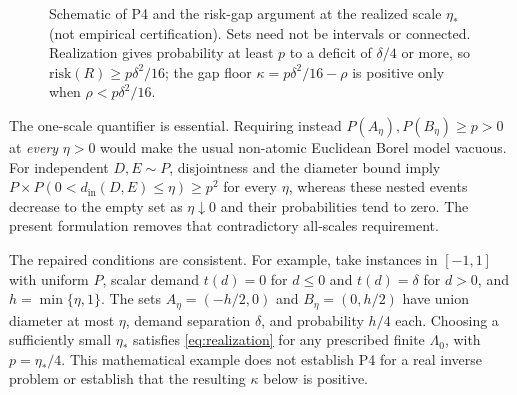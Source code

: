 \documentclass[twoside,11pt]{article}
\begin{document}
\begin{figure}[t]
\caption{Schematic of P4 and the risk-gap argument at the realized scale $\eta_*$ (not empirical certification). Sets need not be intervals or connected. Realization gives probability at least $p$ to a deficit of $\delta/4$ or more, so $\mathrm{risk}(R)\geq p\delta^2/16$; the gap floor $\kappa=p\delta^2/16-\rho$ is positive only when $\rho<p\delta^2/16$.}
\label{fig:p4-geometry}
\end{figure}

The one-scale quantifier is essential. Requiring instead $P(A_\eta),P(B_\eta)\geq p>0$ at \emph{every} $\eta>0$ would make the usual non-atomic Euclidean Borel model vacuous. For independent $D,E\sim P$, disjointness and the diameter bound imply $P\times P(0<d_{\mathrm{in}}(D,E)\leq\eta)\geq p^2$ for every $\eta$, whereas these nested events decrease to the empty set as $\eta\downarrow0$ and their probabilities tend to zero. The present formulation removes that contradictory all-scales requirement.

The repaired conditions are consistent. For example, take instances in $[-1,1]$ with uniform $P$, scalar demand $t(d)=0$ for $d\leq0$ and $t(d)=\delta$ for $d>0$, and $h=\min\{\eta,1\}$. The sets $A_\eta=(-h/2,0)$ and $B_\eta=(0,h/2)$ have union diameter at most $\eta$, demand separation $\delta$, and probability $h/4$ each. Choosing a sufficiently small $\eta_*$ satisfies \eqref{eq:realization} for any prescribed finite $\Lambda_0$, with $p=\eta_*/4$. This mathematical example does not establish P4 for a real inverse problem or establish that the resulting $\kappa$ below is positive.
\end{document}
